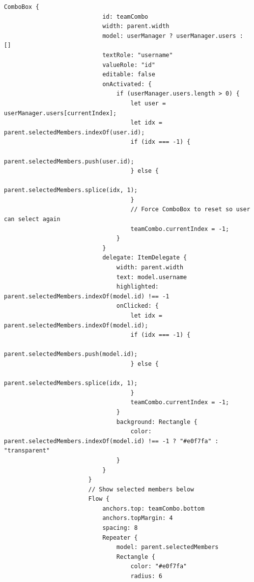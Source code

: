 \documentclass{report}
\begin{document}
\begin{lstlisting}[style=qmlstyle]
                        ComboBox {
                            id: teamCombo
                            width: parent.width
                            model: userManager ? userManager.users : []
                            textRole: "username"
                            valueRole: "id"
                            editable: false
                            onActivated: {
                                if (userManager.users.length > 0) {
                                    let user = userManager.users[currentIndex];
                                    let idx = parent.selectedMembers.indexOf(user.id);
                                    if (idx === -1) {
                                        parent.selectedMembers.push(user.id);
                                    } else {
                                        parent.selectedMembers.splice(idx, 1);
                                    }
                                    // Force ComboBox to reset so user can select again
                                    teamCombo.currentIndex = -1;
                                }
                            }
                            delegate: ItemDelegate {
                                width: parent.width
                                text: model.username
                                highlighted: parent.selectedMembers.indexOf(model.id) !== -1
                                onClicked: {
                                    let idx = parent.selectedMembers.indexOf(model.id);
                                    if (idx === -1) {
                                        parent.selectedMembers.push(model.id);
                                    } else {
                                        parent.selectedMembers.splice(idx, 1);
                                    }
                                    teamCombo.currentIndex = -1;
                                }
                                background: Rectangle {
                                    color: parent.selectedMembers.indexOf(model.id) !== -1 ? "#e0f7fa" : "transparent"
                                }
                            }
                        }
                        // Show selected members below
                        Flow {
                            anchors.top: teamCombo.bottom
                            anchors.topMargin: 4
                            spacing: 8
                            Repeater {
                                model: parent.selectedMembers
                                Rectangle {
                                    color: "#e0f7fa"
                                    radius: 6

\end{lstlisting}
\end{document}
